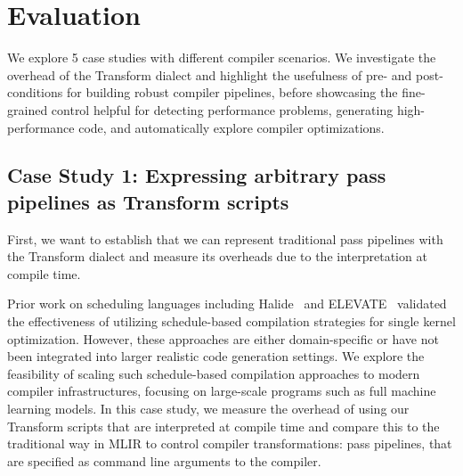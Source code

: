 \documentclass[screen,nonacm,authorversion]{acmart}
\begin{document}
\section{Evaluation}
\label{sec:case_studies}


We explore 5 case studies with different compiler scenarios.
We investigate the overhead of the Transform dialect and highlight the usefulness of pre- and post-conditions for building robust compiler pipelines, before showcasing the fine-grained control helpful for detecting performance problems, generating high-performance code, and automatically explore compiler optimizations.











\subsection{Case Study 1: Expressing arbitrary pass pipelines as Transform scripts}
\label{sec:arbitrary_pass_pipelines}
First, we want to establish that we can represent traditional pass pipelines with the Transform dialect and measure its overheads due to the interpretation at compile time.



Prior work on scheduling languages including Halide~\cite{halide} and ELEVATE~\cite{rise} validated the effectiveness of utilizing schedule-based compilation strategies for single kernel optimization.
However, these approaches are either domain-specific or have not been integrated into larger realistic code generation settings.
We explore the feasibility of scaling such schedule-based compilation approaches to modern compiler infrastructures, focusing on large-scale programs such as full machine learning models.
In this case study, we measure the overhead of using our Transform scripts that are interpreted at compile time and compare this to the traditional way in MLIR to control compiler transformations: pass pipelines, that are specified as command line arguments to the compiler.
\end{document}
